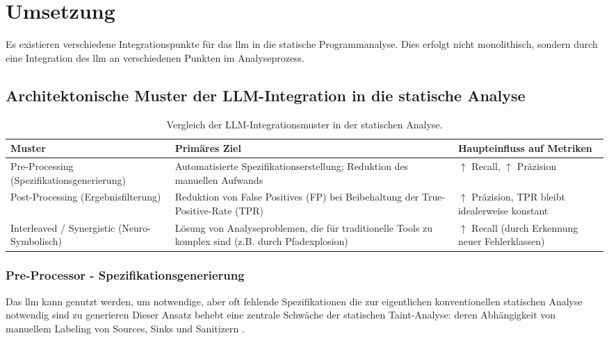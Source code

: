 \section{Umsetzung}

Es existieren verschiedene Integrationspunkte für das \ac{llm} in die statische Programmanalyse. Dies erfolgt nicht monolithisch, sondern durch eine Integration des \ac{llm} an verschiedenen Punkten im Analyseprozess.


\subsection{Architektonische Muster der LLM-Integration in die statische Analyse}
\begin{table}[ht]
\centering
\begin{tabularx}{\textwidth}{>{\raggedright\arraybackslash}X >{\raggedright\arraybackslash}X >{\raggedright\arraybackslash}X}
\hline
\textbf{Muster} & \textbf{Primäres Ziel} & \textbf{Haupteinfluss auf Metriken} \\
\hline
Pre-Processing (Spezifikationsgenerierung) & Automatisierte Spezifikationserstellung; Reduktion des manuellen Aufwands & $\uparrow$ Recall, $\uparrow$ Präzision \\
\hline
Post-Processing (Ergebnisfilterung) & Reduktion von False Positives (FP) bei Beibehaltung der True-Positive-Rate (TPR) & $\uparrow$ Präzision, TPR bleibt idealerweise konstant \\
\hline
Interleaved / Synergistic (Neuro-Symbolisch) & Lösung von Analyseproblemen, die für traditionelle Tools zu komplex sind (z.B. durch Pfadexplosion) & $\uparrow$ Recall (durch Erkennung neuer Fehlerklassen) \\
\hline
\end{tabularx}
\caption{Vergleich der LLM-Integrationsmuster in der statischen Analyse.}
\label{tab:vergleich_ansaetze}
\end{table}

\subsubsection{Pre-Processor - Spezifikationsgenerierung}
Das \ac{llm} kann genutzt werden, um notwendige, aber oft fehlende Spezifikationen die zur eigentlichen konventionellen statischen Analyse notwendig sind zu generieren Dieser Ansatz behebt eine zentrale Schwäche der statischen Taint-Analyse: deren Abhängigkeit von manuellem Labeling von Sources, Sinks und Sanitizern \cite{liIRISLLMAssistedStatic2024}.

